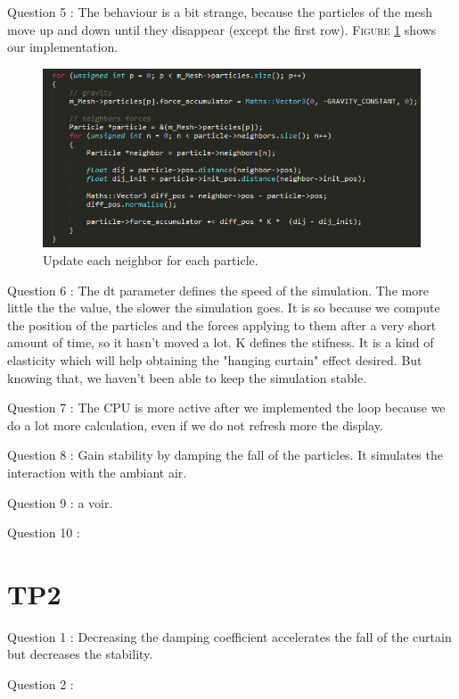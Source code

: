 \documentclass[a4paper,12pt]{article}
\begin{document}
Question 5 : The behaviour is a bit strange, because the particles of the mesh move up and down until they disappear (except the first row).
\textsc{Figure} \ref{fig:q5} shows our implementation.
\begin{figure}
  \centering
  \includegraphics{q5.png}
  \caption{Update each neighbor for each particle.}
  \label{fig:q5}
\end{figure}

Question 6 : The dt parameter defines the speed of the simulation. The more little the the value, the slower the simulation goes. It is so because we compute the position of the particles and the forces applying to them after a very short amount of time, so it hasn't moved a lot.
K defines the stifness. It is a kind of elasticity which will help obtaining the "hanging curtain" effect desired.
But knowing that, we haven't been able to keep the simulation stable.


Question 7 : The CPU is more active after we implemented the loop because we do a lot more calculation, even if we do not refresh more the display.


Question 8 : Gain stability by damping the fall of the particles. It simulates the interaction with the ambiant air.

Question 9 : 	a voir.

Question 10 : 

\section{TP2}

Question 1 : Decreasing the damping coefficient accelerates the fall of the curtain but decreases the stability.

Question 2 :


\end{document}
